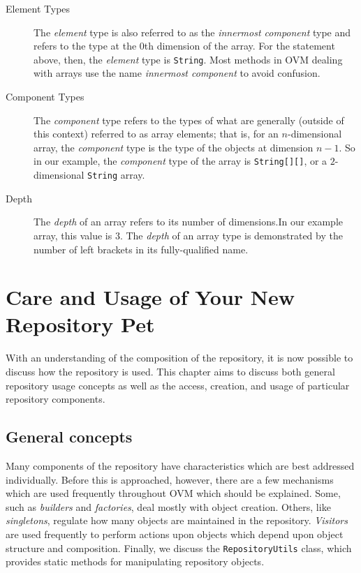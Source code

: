 \documentclass{report}
\begin{document}
\begin{description}

	\item[Element Types]
	The {\em element} type is also referred to as the 
	{\em innermost component} type and refers to the type at the
	0th dimension of the array. For the statement above, then, the 
	{\em element} type is \texttt{String}. Most methods in OVM dealing
	with arrays use the name {\em innermost component} to avoid 
	confusion.

	\item[Component Types]
	The {\em component} type refers to the 
	types of what are generally (outside of this context) referred to as 
	array elements; that is, for an $n$-dimensional array, the 
	{\em component} type is the type of the objects at dimension 
	$n-1$. So in our example, the {\em component} type of the array is
	\texttt{String[][]}, or a $2$-dimensional \texttt{String} array.

	\item[Depth] The {\em depth} of an array refers to its 
	number of dimensions.In our example array, this value is $3$. The 
	{\em depth} of an array type is demonstrated by the number of left 
	brackets in its fully-qualified name.

\end{description}

\chapter{Care and Usage of Your New Repository Pet}\label{usage}


With an understanding of the composition of the repository, it is now possible
to discuss how the repository is used. This chapter aims to discuss both
general repository usage concepts as well as the access, creation, and usage 
of particular repository components.

\section{General concepts}

Many components of the repository have characteristics which are best
addressed individually. Before this is approached, however, there are
a few mechanisms which are used frequently throughout OVM which should be
explained. Some, such as {\em builders} and {\em factories}, deal
mostly with object creation. Others, like {\em singletons}, regulate
how many objects are maintained in the repository. {\em Visitors} are
used frequently to perform actions upon objects which depend upon object
structure and composition. Finally, we discuss the 
\texttt{Re\-pos\-i\-tory\-Utils} class, which provides static methods for 
manipulating repository objects.
\end{document}
